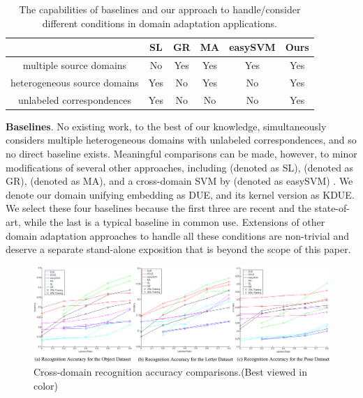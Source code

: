 \documentclass[10pt,twocolumn,letterpaper]{article}
\begin{document}
 \begin{table}[t]
\caption{The capabilities of baselines and our approach to handle/consider different conditions in domain adaptation applications.}
\center
\begin{small}
\begin{tabular}{|c|c|c|c|c|c|}
\hline   & SL \cite{Kulis:ML} & GR \cite{Gopalan:Grassmann,Gong:Grassmann} & MA \cite{Wang:Manifold} & easySVM \cite{Daume:simpleSVM} & Ours\\
\hline  multiple source domains & No & Yes & Yes & Yes & Yes\\
\hline heterogeneous source domains & Yes & No & Yes & No & Yes\\
\hline unlabeled correspondences & Yes & No & No & No & Yes\\
\hline 
\end{tabular}
\end{small}
\vspace{-5pt}
\label{compare}
\end{table}



\noindent\textbf{Baselines}. No existing work, to the best of our knowledge, simultaneously considers  multiple heterogeneous domains with unlabeled correspondences, and so no direct baseline exists. Meaningful comparisons can be made, however, to minor modifications of several other approaches, including \cite{Kulis:ML} (denoted as SL), \cite{Gopalan:Grassmann,Gong:Grassmann} (denoted as GR), \cite{Wang:Manifold} (denoted as MA), and a cross-domain SVM by \cite{Daume:simpleSVM} (denoted as easySVM) . We denote our domain unifying embedding as DUE, and its kernel version as KDUE. We select these four baselines because the first three are recent and the state-of-art, while the last is a  typical baseline in common use. Extensions of other domain adaptation approaches to handle all these conditions are non-trivial and deserve a separate stand-alone exposition that is beyond the scope of this paper.

\begin{figure}[t]
\begin{center}
\includegraphics[scale=1.6]{stat_new_2.png}
\end{center}
\caption{Cross-domain recognition accuracy comparisons.(Best viewed in color)}
\label{stat_2}
\end{figure}
\end{document}

